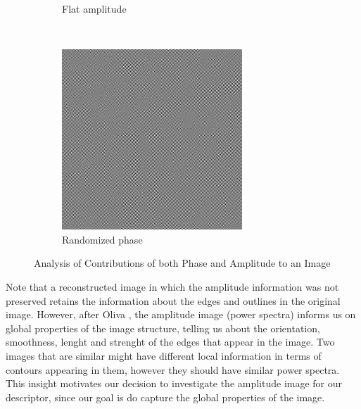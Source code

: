 \documentclass{report}
\begin{document}
\begin{figure}[H]
\begin{subfigure}[b]{0.2\textwidth}
                \caption{Flat amplitude}
                \label{fig:mouse}
        \end{subfigure}
        ~
        \begin{subfigure}[b]{0.2\textwidth}
                \includegraphics[width=\textwidth]{graphics/randomized_phase.jpg}
                \caption{Randomized phase}
                \label{fig:tiger}
        \end{subfigure}
        \caption{Analysis of Contributions of both Phase and Amplitude to an Image}\label{fig:fft_randomization}
\end{figure}
Note that a reconstructed image in which the amplitude information was not preserved retains the information about the edges and outlines in the original image. However, after Oliva \cite{gist_descriptor}, the amplitude image (power spectra) informs us on global properties of the image structure, telling us about the orientation, smoothness, lenght and strenght of the edges that appear in the image.
Two images that are similar might have different local information in terms of contours appearing in them, however they should have similar power spectra. This insight motivates our decision to investigate the amplitude image for our descriptor, since our goal is do capture the global properties of the image.
\end{document}
